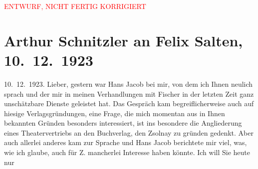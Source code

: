 
\begin{center}
            \textcolor{red}{ENTWURF, NICHT FERTIG KORRIGIERT}
                      \end{center}
            
         
         \renewcommand{\erwaehntePersonen}{Personen: Samuel Fischer, Hans Jacob, Felix Salten, Paul Zsolnay}
         \renewcommand{\erwaehnteOrte}{Orte: Berlin, Paris, Wien, XVIII., Währing}
         \renewcommand{\erwaehnteWerke}{}
               \section[Arthur Schnitzler an Felix Salten, 10. 12. 1923]{ Arthur Schnitzler an Felix Salten, 10. 12. 1923}\nopagebreak{}\rehead{ }\begin{ledgroupsized}[t]{13cm}\normalsize\beginnumbering \toendnotes[C]{\smallbreak\pagebreak[2]} 
\pstart
           \raggedleft{}{\pb}10. 12. 1923. \pend
           \pstart{}Lieber,\pend\pstart
           gestern war Hans Jacob bei mir, von dem ich
               Ihnen neulich sprach und der mir in meinen Verhandlungen mit Fischer in der letzten Zeit ganz unschätzbare Dienste
               geleistet hat. Das Gespräch kam begreiflicherweise auch auf hiesige
               Verlagsgründungen, eine Frage, die mich momentan aus in Ihnen bekannten Gründen
               besonders interessiert, ist ins besondere die Angliederung eines Theatervertriebs an
               den Buchverlag, den Zsolnay zu gründen gedenkt.
               Aber auch allerlei anderes kam zur Sprache und Hans
                  Jacob berichtete mir viel, was, wie ich glaube, auch für Z. mancherlei Interesse haben könnte. Ich will Sie heute nur

\end{ledgroupsized}
